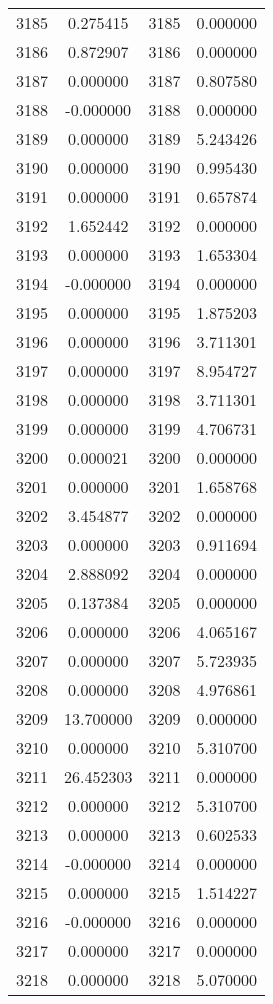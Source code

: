 \documentclass[12pt]{article}
\begin{document}
\begin{longtable}{@{}cccc@{}}
3185 & 0.275415 & 3185 & 0.000000 \\
3186 & 0.872907 & 3186 & 0.000000 \\
3187 & 0.000000 & 3187 & 0.807580 \\
3188 & -0.000000 & 3188 & 0.000000 \\
3189 & 0.000000 & 3189 & 5.243426 \\
3190 & 0.000000 & 3190 & 0.995430 \\
3191 & 0.000000 & 3191 & 0.657874 \\
3192 & 1.652442 & 3192 & 0.000000 \\
3193 & 0.000000 & 3193 & 1.653304 \\
3194 & -0.000000 & 3194 & 0.000000 \\
3195 & 0.000000 & 3195 & 1.875203 \\
3196 & 0.000000 & 3196 & 3.711301 \\
3197 & 0.000000 & 3197 & 8.954727 \\
3198 & 0.000000 & 3198 & 3.711301 \\
3199 & 0.000000 & 3199 & 4.706731 \\
3200 & 0.000021 & 3200 & 0.000000 \\
3201 & 0.000000 & 3201 & 1.658768 \\
3202 & 3.454877 & 3202 & 0.000000 \\
3203 & 0.000000 & 3203 & 0.911694 \\
3204 & 2.888092 & 3204 & 0.000000 \\
3205 & 0.137384 & 3205 & 0.000000 \\
3206 & 0.000000 & 3206 & 4.065167 \\
3207 & 0.000000 & 3207 & 5.723935 \\
3208 & 0.000000 & 3208 & 4.976861 \\
3209 & 13.700000 & 3209 & 0.000000 \\
3210 & 0.000000 & 3210 & 5.310700 \\
3211 & 26.452303 & 3211 & 0.000000 \\
3212 & 0.000000 & 3212 & 5.310700 \\
3213 & 0.000000 & 3213 & 0.602533 \\
3214 & -0.000000 & 3214 & 0.000000 \\
3215 & 0.000000 & 3215 & 1.514227 \\
3216 & -0.000000 & 3216 & 0.000000 \\
3217 & 0.000000 & 3217 & 0.000000 \\
3218 & 0.000000 & 3218 & 5.070000 \\

\end{longtable}
\end{document}

